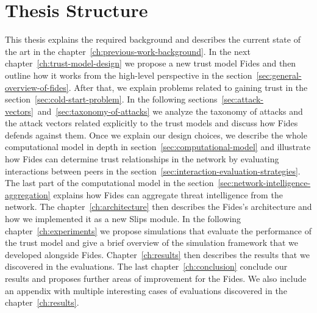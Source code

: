 \section{Thesis Structure}
\label{sec:thesis-structure}
This thesis explains the required background and describes the current state of the art in the chapter~\ref{ch:previous-work-background}.
In the next chapter~\ref{ch:trust-model-design} we propose a new trust model Fides and then outline how it works from the high-level perspective in the section~\ref{sec:general-overview-of-fides}.
After that, we explain problems related to gaining trust in the section~\ref{sec:cold-start-problem}.
In the following sections~\ref{sec:attack-vectors}~and~\ref{sec:taxonomy-of-attacks} we analyze the taxonomy of attacks and the attack vectors related explicitly to the trust models and discuss how Fides defends against them.
Once we explain our design choices, we describe the whole computational model in depth in section~\ref{sec:computational-model} and illustrate how Fides can determine trust relationships in the network by evaluating interactions between peers in the section~\ref{sec:interaction-evaluation-strategies}.
The last part of the computational model in the section~\ref{sec:network-intelligence-aggregation} explains how Fides can aggregate threat intelligence from the network.
The chapter~\ref{ch:architecture} then describes the Fides's architecture and how we implemented it as a new Slips module.
In the following chapter~\ref{ch:experiments} we propose simulations that evaluate the performance of the trust model and give a brief overview of the simulation framework that we developed alongside Fides.
Chapter~\ref{ch:results} then describes the results that we discovered in the evaluations. The last chapter~\ref{ch:conclusion} conclude our results and proposes further areas of improvement for the Fides. 
We also include an appendix with multiple interesting cases of evaluations discovered in the chapter~\ref{ch:results}.

\newpage
